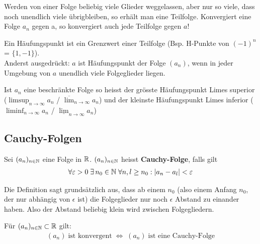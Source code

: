 \begin{definition}[Teilfolge] 
Werden von einer Folge beliebig viele Glieder weggelassen, aber nur so viele,
dass noch unendlich viele übrigbleiben, so erhält man eine Teilfolge.
Konvergiert eine Folge $a_n$ gegen a, so konvergiert auch jede Teilfolge gegen $a$!
\end{definition}

\begin{definition}[Häufungspunkt] 
	Ein Häufungspunkt ist ein Grenzwert einer Teilfolge (Bsp. H-Punkte von $(-1)^n$ = $\{1, -1\}$). \\
	Anderst ausgedrückt: 
	$a$ ist Häufungspunkt der Folge $(a_n)$, wenn in jeder Umgebung von $a$
	unendlich viele Folgeglieder liegen.
\end{definition}

\begin{definition} \index{$\limsup$}\index{$\liminf$}
	Ist $a_n$ eine beschränkte Folge so heisst der grösste Häufungspunkt Limes
	superior ($\limsup_{n \to \infty} a_n$ / $\overline{\lim}_{n \to \infty}
	a_n$) und der kleinste Häufungspunkt Limes inferior ($\liminf_{n \to
	\infty} a_n$ / $\underline{\lim}_{n \to \infty} a_n$)
\end{definition}

\subsection{Cauchy-Folgen}
\begin{definition}
Sei $(a_n)_{n \in \mathbb{N}}$ eine Folge in $\mathbb{R}$. $(a_n)_{n \in \mathbb{N}}$ heisst \textbf{Cauchy-Folge}, falls gilt
\begin{align*}
\forall \varepsilon > 0 \; \exists \, n_0 \in \mathbb{N} \; \forall n, l \geq n_0: |a_n - a_l| < \varepsilon
\end{align*}
\end{definition}

Die Definition sagt grundsätzlich aus, dass ab einem $n_0$ (also einem Anfang $n_0$, der nur abhängig von $\epsilon$ ist)
die Folgeglieder nur noch $\epsilon$ Abstand zu einander haben. Also der Abstand beliebig klein wird zwischen Folgegliedern.

\begin{satz}
Für $(a_n)_{n \in \mathbb{N}} \subset \mathbb{R}$ gilt:
\begin{align*}
	(a_n) \; \text{ist konvergent} \; \Leftrightarrow \; (a_n) \; \text{ist eine Cauchy-Folge}
\end{align*}
\end{satz}


